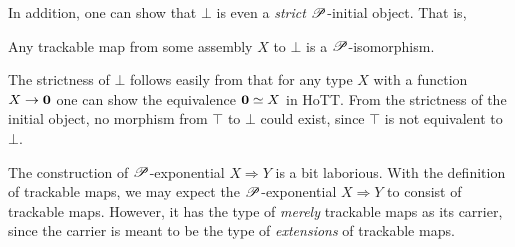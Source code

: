 \documentclass[a4paper,UKenglish,numberwithinsect,cleveref,thm-restate]{lipics-v2021}
\numberwithin{equation}{section}
\theoremstyle{definition}
\theoremstyle{plain}
\begin{document}
In addition, one can show that $\bot$ is even a \emph{strict} $\mathscr{P}$-initial object. That is, 
\begin{proposition}\label{prop:strict-initial}
  Any trackable map from some assembly $X$ to $\bot$ is a $\mathscr{P}$-isomorphism. 
\end{proposition}
The strictness of $\bot$ follows easily from that for any type $X$ with a function $X \to \mathbf{0}$ one can show the equivalence $\mathbf{0} \simeq X$ in HoTT.
From the strictness of the initial object, no morphism from $\top$ to $\bot$ could exist, since $\top$ is not equivalent to $\bot$.

The construction of $\mathscr{P}$-exponential $X \Rightarrow Y$ is a bit laborious.
With the definition of trackable maps, we may expect the $\mathscr{P}$-exponential $X \Rightarrow Y$ to consist of trackable maps.
However, it has the type of \emph{merely} trackable maps as its carrier, since the carrier is meant to be the type of \emph{extensions} of trackable maps.
\end{document}
